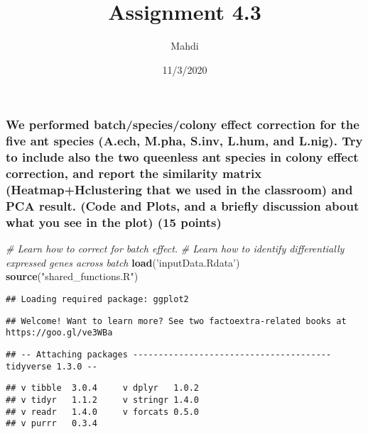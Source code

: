 \documentclass[]{article}
\title{Assignment 4.3}
\author{Mahdi}
\date{11/3/2020}
\newenvironment{Shaded}{\begin{snugshade}}{\end{snugshade}}
\newcommand{\KeywordTok}[1]{\textcolor[rgb]{0.13,0.29,0.53}{\textbf{#1}}}
\newcommand{\StringTok}[1]{\textcolor[rgb]{0.31,0.60,0.02}{#1}}
\newcommand{\CommentTok}[1]{\textcolor[rgb]{0.56,0.35,0.01}{\textit{#1}}}
\newcommand{\NormalTok}[1]{#1}
\begin{document}
\maketitle

\subsubsection{We performed batch/species/colony effect correction for
the five ant species (A.ech, M.pha, S.inv, L.hum, and L.nig). Try to
include also the two queenless ant species in colony effect correction,
and report the similarity matrix (Heatmap+Hclustering that we used in
the classroom) and PCA result. (Code and Plots, and a briefly discussion
about what you see in the plot) (15
points)}\label{we-performed-batchspeciescolony-effect-correction-for-the-five-ant-species-a.ech-m.pha-s.inv-l.hum-and-l.nig.-try-to-include-also-the-two-queenless-ant-species-in-colony-effect-correction-and-report-the-similarity-matrix-heatmaphclustering-that-we-used-in-the-classroom-and-pca-result.-code-and-plots-and-a-briefly-discussion-about-what-you-see-in-the-plot-15-points}

\begin{Shaded}
\begin{Highlighting}[]
\CommentTok{# Learn how to correct for batch effect.}
\CommentTok{# Learn how to identify differentially expressed genes across batch }
\KeywordTok{load}\NormalTok{(}\StringTok{'inputData.Rdata'}\NormalTok{)}
\KeywordTok{source}\NormalTok{(}\StringTok{"shared_functions.R"}\NormalTok{)}
\end{Highlighting}
\end{Shaded}

\begin{verbatim}
## Loading required package: ggplot2
\end{verbatim}

\begin{verbatim}
## Welcome! Want to learn more? See two factoextra-related books at https://goo.gl/ve3WBa
\end{verbatim}

\begin{verbatim}
## -- Attaching packages --------------------------------------- tidyverse 1.3.0 --
\end{verbatim}

\begin{verbatim}
## v tibble  3.0.4     v dplyr   1.0.2
## v tidyr   1.1.2     v stringr 1.4.0
## v readr   1.4.0     v forcats 0.5.0
## v purrr   0.3.4
\end{verbatim}
\end{document}
